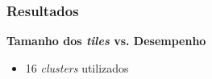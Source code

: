 \documentclass[xcolor={table}]{beamer}
\begin{document}
\begin{frame}\frametitle{Resultados}
    \textbf{Tamanho dos \textit{tiles} vs. Desempenho}

    \begin{itemize}
    \item 16 \textit{clusters} utilizados
    \end{itemize}
    \begin{figure}
        \centering

\end{figure}
\end{frame}
\end{document}
